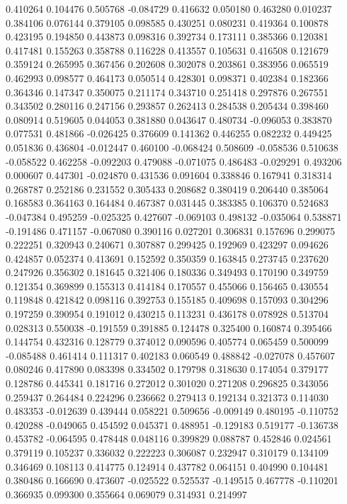 0.410264
0.104476
0.505768
-0.084729
0.416632
0.050180
0.463280
0.010237
0.384106
0.076144
0.379105
0.098585
0.430251
0.080231
0.419364
0.100878
0.423195
0.194850
0.443873
0.098316
0.392734
0.173111
0.385366
0.120381
0.417481
0.155263
0.358788
0.116228
0.413557
0.105631
0.416508
0.121679
0.359124
0.265995
0.367456
0.202608
0.302078
0.203861
0.383956
0.065519
0.462993
0.098577
0.464173
0.050514
0.428301
0.098371
0.402384
0.182366
0.364346
0.147347
0.350075
0.211174
0.343710
0.251418
0.297876
0.267551
0.343502
0.280116
0.247156
0.293857
0.262413
0.284538
0.205434
0.398460
0.080914
0.519605
0.044053
0.381880
0.043647
0.480734
-0.096053
0.383870
0.077531
0.481866
-0.026425
0.376609
0.141362
0.446255
0.082232
0.449425
0.051836
0.436804
-0.012447
0.460100
-0.068424
0.508609
-0.058536
0.510638
-0.058522
0.462258
-0.092203
0.479088
-0.071075
0.486483
-0.029291
0.493206
0.000607
0.447301
-0.024870
0.431536
0.091604
0.338846
0.167941
0.318314
0.268787
0.252186
0.231552
0.305433
0.208682
0.380419
0.206440
0.385064
0.168583
0.364163
0.164484
0.467387
0.031445
0.383385
0.106370
0.524683
-0.047384
0.495259
-0.025325
0.427607
-0.069103
0.498132
-0.035064
0.538871
-0.191486
0.471157
-0.067080
0.390116
0.027201
0.306831
0.157696
0.299075
0.222251
0.320943
0.240671
0.307887
0.299425
0.192969
0.423297
0.094626
0.424857
0.052374
0.413691
0.152592
0.350359
0.163845
0.273745
0.237620
0.247926
0.356302
0.181645
0.321406
0.180336
0.349493
0.170190
0.349759
0.121354
0.369899
0.155313
0.414184
0.170557
0.455066
0.156465
0.430554
0.119848
0.421842
0.098116
0.392753
0.155185
0.409698
0.157093
0.304296
0.197259
0.390954
0.191012
0.430215
0.113231
0.436178
0.078928
0.513704
0.028313
0.550038
-0.191559
0.391885
0.124478
0.325400
0.160874
0.395466
0.144754
0.432316
0.128779
0.374012
0.090596
0.405774
0.065459
0.500099
-0.085488
0.461414
0.111317
0.402183
0.060549
0.488842
-0.027078
0.457607
0.080246
0.417890
0.083398
0.334502
0.179798
0.318630
0.174054
0.379177
0.128786
0.445341
0.181716
0.272012
0.301020
0.271208
0.296825
0.343056
0.259437
0.264484
0.224296
0.236662
0.279413
0.192134
0.321373
0.114030
0.483353
-0.012639
0.439444
0.058221
0.509656
-0.009149
0.480195
-0.110752
0.420288
-0.049065
0.454592
0.045371
0.488951
-0.129183
0.519177
-0.136738
0.453782
-0.064595
0.478448
0.048116
0.399829
0.088787
0.452846
0.024561
0.379119
0.105237
0.336032
0.222223
0.306087
0.232947
0.310179
0.134109
0.346469
0.108113
0.414775
0.124914
0.437782
0.064151
0.404990
0.104481
0.380486
0.166690
0.473607
-0.025522
0.525537
-0.149515
0.467778
-0.110201
0.366935
0.099300
0.355664
0.069079
0.314931
0.214997
